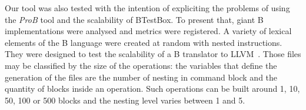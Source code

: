\documentclass[runningheads]{llncs}
\begin{document}

Our tool was also tested with the intention of expliciting the problems of using the \textit{ProB} tool and the scalability of BTestBox. To present that, giant B implementations were analysed and metrics were registered. A variety of lexical elements of the B language were created at random with nested instructions. They were designed to test the scalability of a B translator to LLVM~\cite{deharbebtestbox}. Those files may be classified by the size of the operations: the variables that define the generation of the files are the number of nesting in command block and the quantity of blocks inside an operation. Such operations can be built around 1, 10, 50, 100 or 500 blocks and the nesting level varies between 1 and 5.
\end{document}
